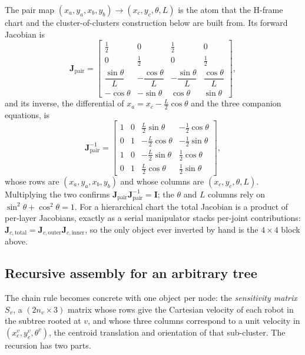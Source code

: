 \documentclass[12pt, letterpaper, oneside]{report}
\begin{document}
The pair map $(x_a,y_a,x_b,y_b)\to(x_c,y_c,\theta,L)$ is the atom that the
H-frame chart and the cluster-of-clusters construction below are built
from. Its forward Jacobian is
\begin{equation}
\mathbf{J}_{\text{pair}} =
\begin{bmatrix}
\tfrac12 & 0 & \tfrac12 & 0 \\[2pt]
0 & \tfrac12 & 0 & \tfrac12 \\[2pt]
\dfrac{\sin\theta}{L} & -\dfrac{\cos\theta}{L} & -\dfrac{\sin\theta}{L} & \dfrac{\cos\theta}{L} \\[6pt]
-\cos\theta & -\sin\theta & \cos\theta & \sin\theta
\end{bmatrix},
\label{eq:jpair}
\end{equation}
and its inverse, the differential of $x_a=x_c-\tfrac{L}{2}\cos\theta$ and
the three companion equations, is
\begin{equation}
\mathbf{J}_{\text{pair}}^{-1} =
\begin{bmatrix}
1 & 0 & \tfrac{L}{2}\sin\theta & -\tfrac12\cos\theta \\[3pt]
0 & 1 & -\tfrac{L}{2}\cos\theta & -\tfrac12\sin\theta \\[3pt]
1 & 0 & -\tfrac{L}{2}\sin\theta & \tfrac12\cos\theta \\[3pt]
0 & 1 & \tfrac{L}{2}\cos\theta & \tfrac12\sin\theta
\end{bmatrix},
\label{eq:jpair_inv}
\end{equation}
whose rows are $(x_a,y_a,x_b,y_b)$ and whose columns are $(x_c,y_c,\theta,L)$.
Multiplying the two confirms $\mathbf{J}_{\text{pair}}\mathbf{J}_{\text{pair}}^{-1}=\mathbf{I}$;
the $\theta$ and $L$ columns rely on $\sin^2\theta+\cos^2\theta=1$. For a
hierarchical chart the total Jacobian is a product of per-layer Jacobians,
exactly as a serial manipulator stacks per-joint contributions:
$\mathbf{J}_{c,\text{total}}=\mathbf{J}_{c,\text{outer}}\mathbf{J}_{c,\text{inner}}$,
so the only object ever inverted by hand is the $4\times4$ block above.

\subsection{Recursive assembly for an arbitrary tree}

The chain rule becomes concrete with one object per node: the
\emph{sensitivity matrix} $S_v$, a $(2n_v\times3)$ matrix whose rows give
the Cartesian velocity of each robot in the subtree rooted at $v$, and whose
three columns correspond to a unit velocity in $(x_c^v,y_c^v,\theta^v)$, the
centroid translation and orientation of that sub-cluster. The recursion has
two parts.
\end{document}
